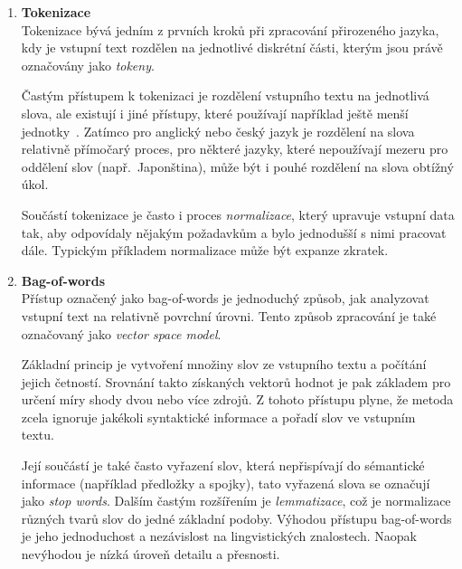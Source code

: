 \begin{enumerate}
	\item \textbf{Tokenizace}\\
	      Tokenizace bývá jedním z prvních kroků při zpracování přirozeného jazyka, kdy je vstupní text
	      rozdělen na jednotlivé diskrétní části, kterým jsou právě označovány jako \emph{tokeny}.~\cite{the_conversational_interface}

	      Častým přístupem k tokenizaci je rozdělení vstupního textu na jednotlivá slova,
	      ale existují i jiné přístupy, které používají například ještě menší jednotky~\cite{yang2024rethinking}.
	      Zatímco pro anglický nebo český jazyk je rozdělení na slova relativně přímočarý proces, pro některé jazyky,
	      které nepoužívají mezeru pro oddělení slov (např.~Japonština), může být i pouhé rozdělení na slova obtížný úkol.~\cite{the_conversational_interface}

	      Součástí tokenizace je často i proces \emph{normalizace}, který upravuje vstupní data tak, aby odpovídaly nějakým požadavkům
	      a bylo jednodušší s nimi pracovat dále.
	      Typickým příkladem normalizace může být expanze zkratek.~\cite{the_conversational_interface}

	\item \textbf{Bag-of-words}\\
	      Přístup označený jako bag-of-words je jednoduchý způsob, jak analyzovat vstupní text na relativně povrchní úrovni.
	      Tento způsob zpracování je také označovaný jako \emph{vector space model}.~\cite{the_conversational_interface}

	      Základní princip je vytvoření množiny slov ze vstupního textu a počítání jejich četností.
	      Srovnání takto získaných vektorů hodnot je pak základem pro určení míry shody dvou nebo více zdrojů.
	      Z tohoto přístupu plyne, že metoda zcela ignoruje jakékoli syntaktické informace a pořadí slov ve vstupním textu.~\cite{the_conversational_interface}

	      Její součástí je také často vyřazení slov, která nepřispívají do sémantické informace (například předložky a spojky),
	      tato vyřazená slova se označují jako \emph{stop words}.
	      Dalším častým rozšířením je \emph{lemmatizace}, což je normalizace různých tvarů slov do jedné základní podoby.
	      Výhodou přístupu bag-of-words je jeho jednoduchost a nezávislost na lingvistických znalostech.
	      Naopak nevýhodou je nízká úroveň detailu a přesnosti.~\cite{the_conversational_interface}


\end{enumerate}
